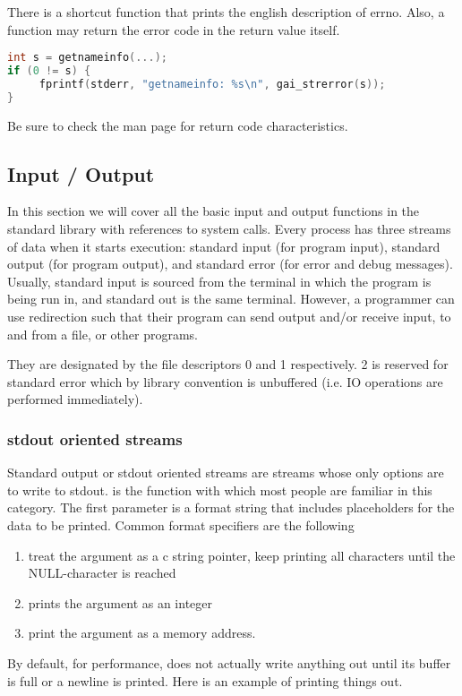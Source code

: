 There is a shortcut function  that prints the english description of errno.
Also, a function may return the error code in the return value itself.

\begin{lstlisting}[language=C]
int s = getnameinfo(...);
if (0 != s) {
     fprintf(stderr, "getnameinfo: %s\n", gai_strerror(s));
}
\end{lstlisting}

Be sure to check the man page for return code characteristics.

\subsection{Input / Output}

In this section we will cover all the basic input and output functions in the standard library with references to system calls.
Every process has three streams of data when it starts execution: standard input (for program input), standard output (for program output), and standard error (for error and debug messages).
Usually, standard input is sourced from the terminal in which the program is being run in, and standard out is the same terminal.
However, a programmer can use redirection such that their program can send output and/or receive input, to and from a file, or other programs.

They are designated by the file descriptors 0 and 1 respectively. 2 is reserved for standard error which by library convention is unbuffered (i.e. IO operations are performed immediately).

\subsubsection{stdout oriented streams}

Standard output or stdout oriented streams are streams whose only options are to write to stdout.
 is the function with which most people are familiar in this category.
The first parameter is a format string that includes placeholders for the data to be printed.
Common format specifiers are the following
\begin{enumerate}
\item {} treat the argument as a c string pointer, keep printing all characters until the NULL-character is reached
\item {} prints the argument as an integer
  \item {} print the argument as a memory address.
    \end{enumerate}
By default, for performance,  does not actually write anything out until its buffer is full or a newline is printed.
Here is an example of printing things out.

